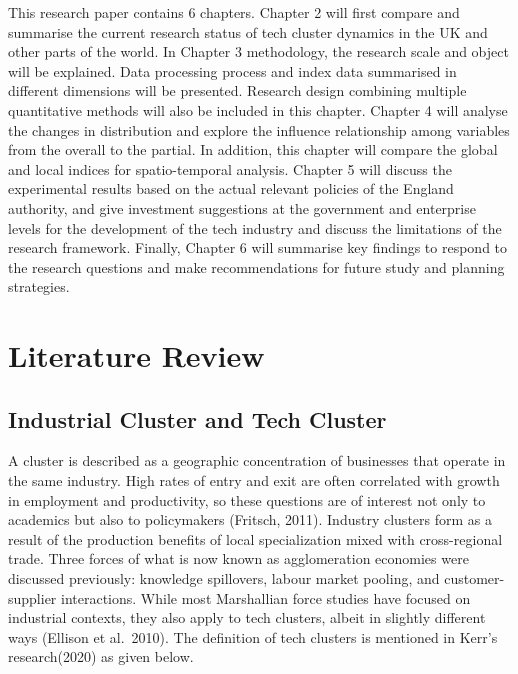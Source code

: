 \documentclass[
  12pt,
  oneside]{book}
\begin{document}
This research paper contains 6 chapters. Chapter 2 will first compare and summarise the current research status of tech cluster dynamics in the UK and other parts of the world. In Chapter 3 methodology, the research scale and object will be explained. Data processing process and index data summarised in different dimensions will be presented. Research design combining multiple quantitative methods will also be included in this chapter. Chapter 4 will analyse the changes in distribution and explore the influence relationship among variables from the overall to the partial. In addition, this chapter will compare the global and local indices for spatio-temporal analysis. Chapter 5 will discuss the experimental results based on the actual relevant policies of the England authority, and give investment suggestions at the government and enterprise levels for the development of the tech industry and discuss the limitations of the research framework. Finally, Chapter 6 will summarise key findings to respond to the research questions and make recommendations for future study and planning strategies.

\hypertarget{lit-review}{%
\chapter{Literature Review}\label{lit-review}}

\hypertarget{industrial-cluster-and-tech-cluster}{%
\section{Industrial Cluster and Tech Cluster}\label{industrial-cluster-and-tech-cluster}}

A cluster is described as a geographic concentration of businesses that operate in the same industry. High rates of entry and exit are often correlated with growth in employment and productivity, so these questions are of interest not only to academics but also to policymakers (Fritsch, 2011). Industry clusters form as a result of the production benefits of local specialization mixed with cross-regional trade. Three forces of what is now known as agglomeration economies were discussed previously: knowledge spillovers, labour market pooling, and customer-supplier interactions. While most Marshallian force studies have focused on industrial contexts, they also apply to tech clusters, albeit in slightly different ways (Ellison et al.~2010). The definition of tech clusters is mentioned in Kerr's research(2020) as given below.
\end{document}
